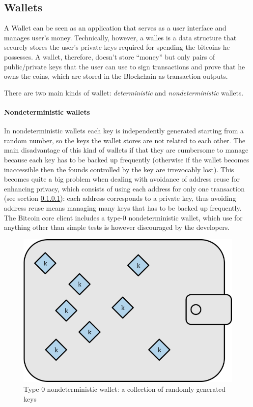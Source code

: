 \subsection{Wallets} A Wallet can be seen as an application that serves as a
user interface and manages user's money. Technically, however, a walles is a
data structure that securely stores the user's private keys required for
spending the bitcoins he possesses. A wallet, therefore, doesn't store ``money''
but only pairs of public/private keys that the user can use to sign transactions
and prove that he owns the coins, which are stored in the Blockchain as
transaction outputs.

There are two main kinds of wallet: \emph{deterministic} and
\emph{nondeterministic} wallets.

\paragraph{Nondeterministic wallets} In nondeterministic wallets each key is
independently generated starting from a random number, so the keys the wallet
stores are not related to each other. The main disadvantage of this kind of
wallets if that they are cumbersome to manage because each key has to be backed
up frequently (otherwise if the wallet becomes inaccessible then the founds
controlled by the key are irrevocably lost). This becomes quite a big problem
when dealing with avoidance of address reuse for enhancing privacy, which
consists of using each address for only one transaction (see section \ref{}):
each address corresponds to a private key, thus avoiding address reuse means
managing many keys that has to be backed up frequently. The Bitcoin core client
includes a type-0 nondeterministic wallet, which use for anything other than
simple tests is however discouraged by the developers.
\begin{figure}[!htb]
	\centering
	\includegraphics[width=0.5\linewidth]{img/nondeterministic-wallet.png}
	\caption{Type-0 nondeterministic wallet: a collection of randomly generated keys}
	\label{fig:nondeterministic-wallet}
\end{figure}

